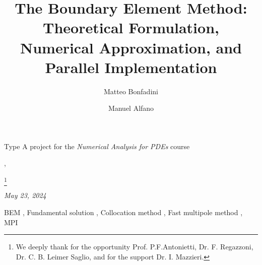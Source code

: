 \documentclass[numbers]{ifacconf}
\begin{document}

\begin{frontmatter}


\title{The Boundary Element Method: Theoretical Formulation, Numerical Approximation, and Parallel Implementation}

Type A project for the \textit{Numerical Analysis for PDEs} course

\author[first]{Matteo Bonfadini}, 
\author[second]{Manuel Alfano}

\thanks[ty]{We deeply thank for the opportunity Prof. P.F.Antonietti, Dr. F. Regazzoni, Dr. C. B. Leimer Saglio, and for the support Dr. I. Mazzieri.} 

\address[first]{Politecnico di Milano,
Piazza Leonardo da Vinci 32, 20133 Milano, Italy (e-mail: \normalfont\texttt{matteo.bonfadini@mail.polimi.it})}

\address[second]{Politecnico di Milano,
Piazza Leonardo da Vinci 32, 20133 Milano, Italy (e-mail: \normalfont\texttt{manuel.alfano@mail.polimi.it})}

\textit{May 23, 2024}



\begin{keyword}
BEM \sep 
Fundamental solution \sep
Collocation method \sep
Fast multipole method \sep
MPI
\end{keyword}

\end{frontmatter}











%




\end{document}
